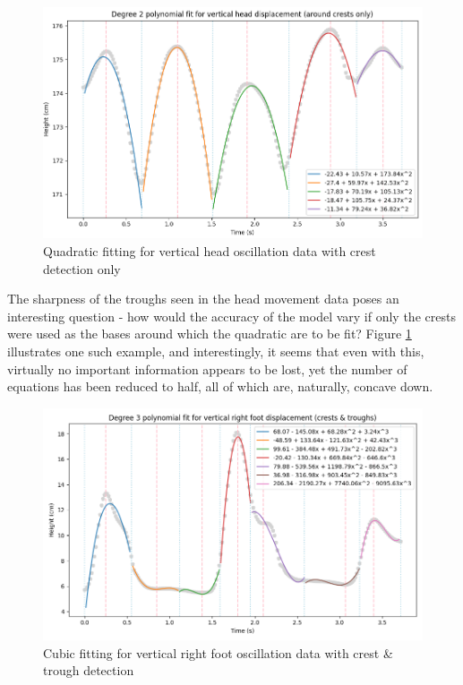 \documentclass[12pt, a4paper]{article}
\begin{document}
\begin{figure}[H]
    \centering
    \includegraphics[width=14cm]{p_peaks_crestsonly_head_2.png}
    \caption{ Quadratic fitting for vertical head oscillation data with crest
        detection only } 
    \label{crestsonly_head}
\end{figure}

The sharpness of the troughs seen in the head movement data poses an interesting
question - how would the accuracy of the model vary if only the crests were used
as the bases around which the quadratic are to be fit? Figure
\ref{crestsonly_head} illustrates one such example, and interestingly, it seems
that even with this, virtually no important information appears to be lost, yet
the number of equations has been reduced to half, all of which are, naturally,
concave down.

\begin{figure}[H]
    \centering
    \includegraphics[width=14cm]{p_peaks_right_3.png}
    \caption{ Cubic fitting for vertical right foot oscillation data with crest
        \& trough detection } 
    \label{peaks_right}
\end{figure}
\end{document}
